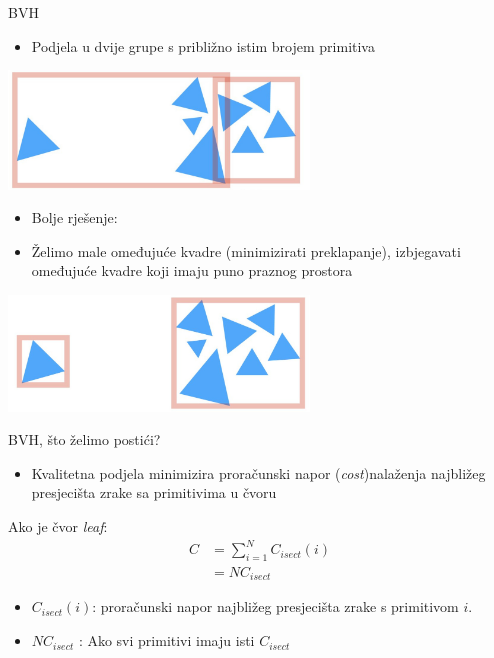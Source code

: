 \documentclass[9pt]{beamer}
\begin{document}
\begin{frame}{BVH}
	\begin{itemize}
		\item Podjela u dvije grupe s približno istim brojem primitiva
	\end{itemize}
	\begin{center}
		\includegraphics[width=0.6\textwidth]{slike/slide_028_a.jpg}
	\end{center}
	\begin{itemize}
		\item Bolje rješenje:
		\item Želimo male omeđujuće kvadre (minimizirati preklapanje), izbjegavati omeđujuće kvadre koji imaju puno praznog prostora	
	\end{itemize}
	\begin{center}
		\includegraphics[width=0.6\textwidth]{slike/slide_028_b.jpg}
	\end{center}
\end{frame}

\begin{frame}{BVH, što želimo postići?}
	\begin{itemize}
		\item Kvalitetna podjela minimizira proračunski napor (\textit{cost})nalaženja najbližeg presjecišta zrake sa primitivima u čvoru
	\end{itemize}
Ako je čvor \textit{leaf}:
	\begin{align*}
		C &= \sum_{i=1}^{N} C_{isect}(i) \\
		  &= N C_{isect}
	\end{align*}
	\begin{itemize}
		\item $C_{isect}(i)$:  proračunski napor najbližeg presjecišta zrake s primitivom $i$. 
		\item  $N C_{isect}$ : Ako svi primitivi imaju isti $C_{isect}$
	\end{itemize}
\end{frame}
\end{document}

